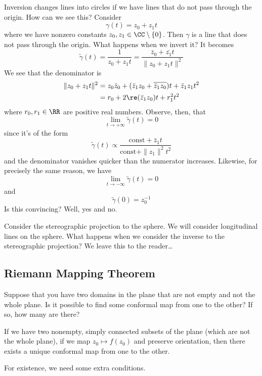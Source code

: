 Inversion changes lines into circles if we have lines that do not
pass through the origin. How can we see this? Consider
\begin{equation}
\gamma(t) = z_{0}+z_{1}t
\end{equation}
where we have nonzero constants
$z_{0},z_{1}\in\CC\setminus\{0\}$. Then $\gamma$ is a line that
does not pass through the origin. What happens when we invert it?
It becomes
\begin{equation}
\widetilde{\gamma}(t)=\frac{1}{z_{0}+z_{1}t}=\frac{\bar{z}_{0}+\bar{z_{1}}t}{\|z_{0}+z_{1}t\|^{2}}
\end{equation}
We see that the denominator is
\begin{subequations}
\begin{align}
\|z_{0}+z_{1}t\|^{2} &= z_{0}\bar{z}_{0}+(\bar{z}_{1}z_{0}+\overline{\bar{z}_{1}z_{0}})t+\bar{z}_{1}z_{1}t^{2}\\
&= r_{0} + 2\re(\bar{z}_{1}z_{0})t+r_{1}^{2}t^{2}
\end{align}
\end{subequations}
where $r_{0},r_{1}\in\RR$ are positive real numbers. Observe,
then, that
\begin{equation}
\lim_{t\to+\infty}\widetilde{\gamma}(t)=0
\end{equation}
since it's of the form
\begin{equation}
\widetilde{\gamma}(t)\propto\frac{\mbox{const}+\bar{z}_{1}t}{\mbox{const}+\|z_{1}\|^{2}t^{2}}
\end{equation}
and the denominator vanishes quicker than the numerator
increases. Likewise, for precisely the same reason, we have
\begin{equation}
\lim_{t\to-\infty}\widetilde{\gamma}(t)=0
\end{equation}
and
\begin{equation}
\widetilde{\gamma}(0)=z_{0}^{-1}
\end{equation}
Is this convincing? Well, yes and no.

Consider the stereographic projection to the sphere. We will
consider longitudinal lines on the sphere. What happens when we
consider the inverse to the stereographic projection? We leave
this to the reader\dots

\subsection{Riemann Mapping Theorem}
Suppose that you have two domains in the plane that are not empty
and not the whole plane. Is it possible to find some conformal
map from one to the other? If so, how many are there?

\begin{thm}
If we have two nonempty, simply connected subsets of the plane
(which are not the whole plane), if we map $z_{0}\mapsto
f(z_{0})$ and preserve orientation, then there exists a unique
conformal map from one to the other.
\end{thm}

For existence, we need some extra conditions.
